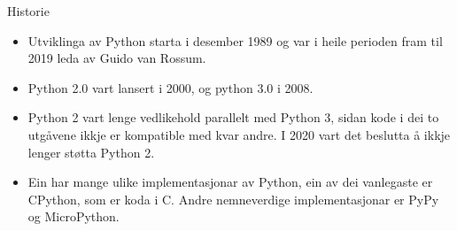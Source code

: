 \begin{frame}{Historie}
  \begin{itemize}
    \item Utviklinga av Python starta i desember 1989 og var i heile perioden fram til 2019 leda av Guido van Rossum.
    \item Python 2.0 vart lansert i 2000, og python 3.0 i 2008.
    \item Python 2 vart lenge vedlikehold parallelt med Python 3, sidan kode i dei to utgåvene ikkje er kompatible med kvar andre. I 2020 vart det beslutta å ikkje lenger støtta Python 2. 
    \item Ein har mange ulike implementasjonar av Python, ein av dei vanlegaste er CPython, som er koda i C. Andre nemneverdige implementasjonar er PyPy og MicroPython.
  \end{itemize}

\end{frame}


